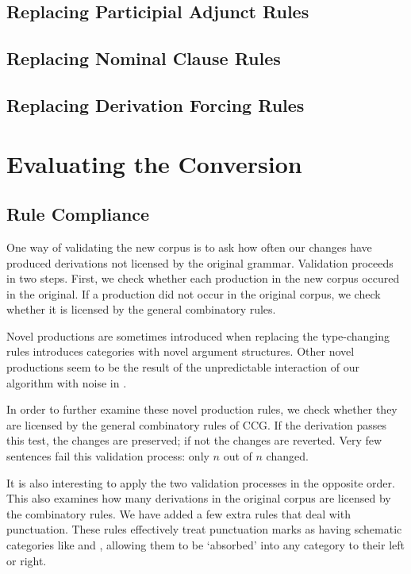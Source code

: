 \subsection{Replacing Participial Adjunct Rules}

\subsection{Replacing Nominal Clause Rules}

\subsection{Replacing Derivation Forcing Rules}

\section{Evaluating the Conversion}



\subsection{Rule Compliance}

One way of validating the new corpus is to ask how often our changes have produced derivations not licensed by the original grammar. Validation proceeds in two steps. First, we check whether each production in the new corpus occured in the original. If a production did not occur in the original corpus, we check whether it is licensed by the general combinatory rules.

Novel productions are sometimes introduced when replacing the type-changing rules introduces categories with novel argument structures. Other novel productions seem to be the result of the unpredictable interaction of our algorithm with noise in \ccgbank.

In order to further examine these novel production rules, we check whether they are licensed by the general combinatory rules of CCG. If the derivation passes this test, the changes are preserved; if not the changes are reverted. Very few sentences fail this validation process: only $n$ out of $n$ changed.

It is also interesting to apply the two validation processes in the opposite order. This also examines how many derivations in the original corpus are licensed by the \ccg combinatory rules. We have added a few extra rules that deal with punctuation. These rules effectively treat punctuation marks as having schematic categories like  and , allowing them to be `absorbed' into any category to their left or right.

